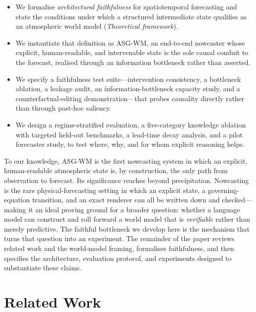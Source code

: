 \documentclass[fleqn,10pt]{wlscirep}
\begin{document}
\begin{itemize}[leftmargin=1.2em,itemsep=2pt,topsep=3pt]
\item We formalise \emph{architectural faithfulness} for spatiotemporal forecasting and state the conditions under which a structured intermediate state qualifies as an atmospheric world model (\emph{Theoretical framework}).
\item We instantiate that definition as ASG-WM, an end-to-end nowcaster whose explicit, human-readable, and intervenable state is the sole causal conduit to the forecast, realised through an information bottleneck rather than asserted.
\item We specify a faithfulness test suite---intervention consistency, a bottleneck ablation, a leakage audit, an information-bottleneck capacity study, and a counterfactual-editing demonstration---that probes causality directly rather than through post-hoc saliency.
\item We design a regime-stratified evaluation, a five-category knowledge ablation with targeted held-out benchmarks, a lead-time decay analysis, and a pilot forecaster study, to test where, why, and for whom explicit reasoning helps.
\end{itemize}

\noindent To our knowledge, ASG-WM is the first nowcasting system in which an explicit, human-readable atmospheric state is, by construction, the only path from observation to forecast.
Its significance reaches beyond precipitation. Nowcasting is the rare physical-forecasting setting in which an explicit state, a governing-equation transition, and an exact renderer can all be written down and checked---making it an ideal proving ground for a broader question: whether a language model can construct and roll forward a world model that is \emph{verifiable} rather than merely predictive. The faithful bottleneck we develop here is the mechanism that turns that question into an experiment.
The remainder of the paper reviews related work and the world-model framing, formalises faithfulness, and then specifies the architecture, evaluation protocol, and experiments designed to substantiate these claims.

\section*{Related Work}
\end{document}
